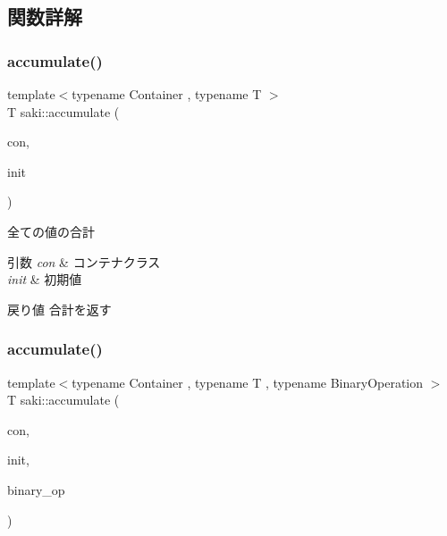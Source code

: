 \subsection{関数詳解}
\mbox{\label{namespacesaki_a0f9963378e1e25eb379f002fc2675544}} 
\subsubsection{\texorpdfstring{accumulate()}{accumulate()}\hspace{0.1cm}{\footnotesize\ttfamily [1/2]}}
{\footnotesize\ttfamily template$<$typename Container , typename T $>$ \\
T saki\+::accumulate (\begin{DoxyParamCaption}\item[{const Container \&}]{con,  }\item[{T}]{init }\end{DoxyParamCaption})}



全ての値の合計 


\begin{DoxyParams}{引数}
{\em con} & コンテナクラス \\
\hline
{\em init} & 初期値 \\
\hline
\end{DoxyParams}
\begin{DoxyReturn}{戻り値}
合計を返す 
\end{DoxyReturn}
\mbox{\label{namespacesaki_a8ecf606c3b0a7c7448938838e528de7b}} 
\subsubsection{\texorpdfstring{accumulate()}{accumulate()}\hspace{0.1cm}{\footnotesize\ttfamily [2/2]}}
{\footnotesize\ttfamily template$<$typename Container , typename T , typename Binary\+Operation $>$ \\
T saki\+::accumulate (\begin{DoxyParamCaption}\item[{const Container \&}]{con,  }\item[{T}]{init,  }\item[{const Binary\+Operation \&}]{binary\+\_\+op }\end{DoxyParamCaption})}



